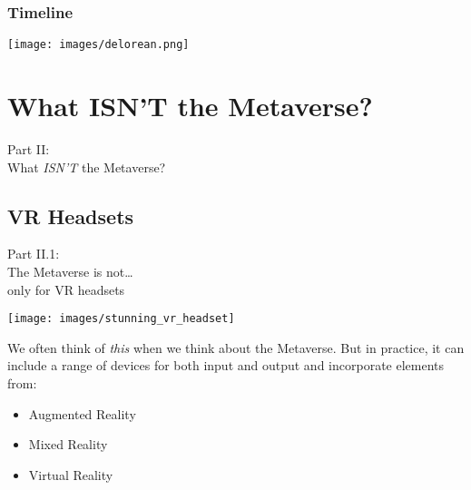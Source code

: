 \documentclass[aspectratio=169,x11names]{beamer}
\begin{document}
\begin{frame}
\frametitle{Timeline}
\vfill\vfill
\begin{center}
\texttt{[image: images/delorean.png]} 
\end{center}
\end{frame}

\section{What ISN'T the Metaverse?}

\begin{frame}
\begin{center}
\Large
Part II:\bigskip\\
\huge
What \emph{ISN'T} the Metaverse?
\end{center}
\end{frame}

\subsection{VR Headsets}

\begin{frame}
\begin{center}
\Large
Part II.1:\bigskip\\
\huge
The Metaverse is not\dots\\ only for VR headsets
\end{center}
\end{frame}

\begin{frame}
\begin{minipage}{0.55\textwidth}
\begin{center}
\texttt{[image: images/stunning\_vr\_headset]} 
\end{center}
\end{minipage}%
\begin{minipage}{0.45\textwidth}
We often think of \emph{this} when we think about the Metaverse. But in practice,
it can include a range of devices for both input and output and incorporate elements from:
\begin{itemize}
\item Augmented Reality
\item Mixed Reality
\item Virtual Reality
\end{itemize}
\end{minipage}
\end{frame}
\end{document}
